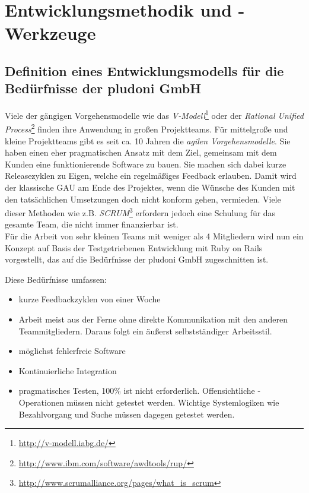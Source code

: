 \chapter{Entwicklungsmethodik und -Werkzeuge}
\label{sec:auswahl}
\section{Definition eines Entwicklungsmodells für die Bedürfnisse der pludoni GmbH}
Viele der gängigen Vorgehensmodelle wie das \textit{V-Modell}\footnote{\url{http://v-modell.iabg.de/}} oder der \textit{Rational Unified Process}\footnote{\url{http://www.ibm.com/software/awdtools/rup/}} finden ihre Anwendung in großen Projektteams. Für mittelgroße und kleine Projektteams gibt es seit ca. 10 Jahren die \textit{agilen Vorgehensmodelle}. Sie haben einen eher pragmatischen Ansatz mit dem Ziel, gemeinsam mit dem Kunden eine funktionierende Software zu bauen. Sie machen sich dabei kurze Releasezyklen zu Eigen, welche ein regelmäßiges Feedback erlauben. Damit wird der klassische GAU am Ende des Projektes, wenn die Wünsche des Kunden mit den tatsächlichen Umsetzungen doch nicht konform gehen, vermieden. Viele dieser Methoden wie z.B. \textit{SCRUM}\footnote{\url{http://www.scrumalliance.org/pages/what_is_scrum}} erfordern jedoch eine Schulung für das gesamte Team, die nicht immer finanzierbar ist.\\
Für die Arbeit von sehr kleinen Teams mit weniger als 4 Mitgliedern wird nun ein Konzept auf Basis der Testgetriebenen Entwicklung mit Ruby on Rails vorgestellt, das auf die Bedürfnisse der pludoni GmbH zugeschnitten ist.

Diese Bedürfnisse umfassen:
\begin{itemize}
 \item kurze Feedbackzyklen von einer Woche
 \item Arbeit meist aus der Ferne ohne direkte Kommunikation mit den anderen Teammitgliedern. Daraus folgt ein äußerst selbstständiger Arbeitsstil.
 \item möglichst fehlerfreie Software
 \item Kontinuierliche Integration
 \item pragmatisches Testen, 100\%  ist nicht erforderlich. Offensichtliche -Operationen müssen nicht getestet werden.  Wichtige Systemlogiken wie Bezahlvorgang und Suche müssen dagegen getestet werden.
\end{itemize}

